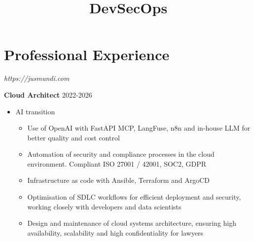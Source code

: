 \documentclass[11pt,a4paper]{moderncv}
\title{DevSecOps}
\begin{document}
\makecvtitle

\section{Professional Experience}

{
\textit{https://jusmundi.com}
\bigskip

\textbf{Cloud Architect} \hfill 2022-2026
	\begin{itemize}%
		\item AI transition
			\begin{itemize}%
				\item Use of OpenAI with FastAPI MCP, LangFuse, n8n and in-house LLM for better quality and cost control
				\item Automation of security and compliance processes in the cloud environment. Compliant ISO 27001 / 42001, SOC2, GDPR
				\item Infrastructure as code with Ansible, Terraform and ArgoCD
				\item Optimisation of SDLC workflows for efficient deployment and security, working closely with developers and data scientists
				\item Design and maintenance of cloud systems architecture, ensuring high availability, scalability and high confidentiality for lawyers
			\end{itemize}
	\end{itemize}
}
\bigskip
{}
\end{document}
